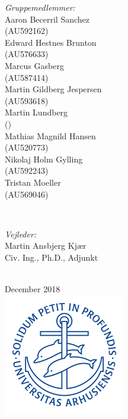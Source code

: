 \begin{titlepage}
\begin{minipage}{0.4\textwidth}
\begin{flushleft} \small
\emph{Gruppemedlemmer:}
\\Aaron Becerril Sanchez\\ (AU592162)
\\Edward Hestnes Brunton\\ (AU576633)
\\Marcus Gasberg\\ (AU587414) 
\\Martin Gildberg Jespersen\\ (AU593618) 
\\Martin Lundberg\\ () 
\\Mathias Magnild Hansen\\ (AU520773)
\\Nikolaj Holm Gylling\\ (AU592243)
\\Tristan Moeller\\ (AU569046)
\end{flushleft}
\end{minipage}
~
\begin{minipage}{0.4\textwidth}
\begin{flushright} \small
\emph{Vejleder:} \\
Martin Ansbjerg Kjær \\ Civ. Ing., Ph.D., Adjunkt %
\end{flushright}
\end{minipage}\\[1cm]



{\large December 2018}\\[1cm] %


\includegraphics{Setup/Graphics-setup/AU_LOGO.png}\\[1cm] %

\vfill
\end{titlepage}